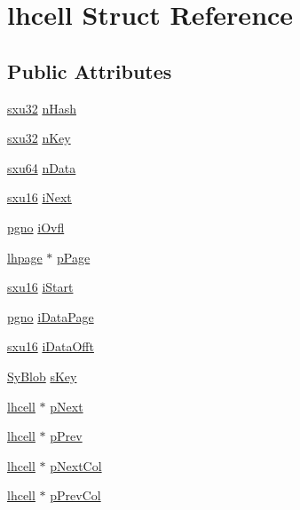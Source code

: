 \hypertarget{structlhcell}{\section{lhcell Struct Reference}
\label{d1/da5/structlhcell}
}
\subsection*{Public Attributes}
\begin{DoxyCompactItemize}
\item 
\hyperlink{unqlite_8c_abc5a8a3f345c200c98c485551f49666e}{sxu32} \hyperlink{structlhcell_ad83ba2a9872c6f072ad98863cf0d2006}{n\-Hash}
\item 
\hyperlink{unqlite_8c_abc5a8a3f345c200c98c485551f49666e}{sxu32} \hyperlink{structlhcell_a8f5089adfa380c55d39fe414ecc65e18}{n\-Key}
\item 
\hyperlink{unqlite_8c_a7fcad780486f719d7abaa7a12516b6c6}{sxu64} \hyperlink{structlhcell_a3fbad51e81a0a4ea44aae01e1fa2671e}{n\-Data}
\item 
\hyperlink{unqlite_8c_a0fea45724d256332e7ae0104f83260a7}{sxu16} \hyperlink{structlhcell_adf5c5ea52f46d1f944fa1560c871ae8a}{i\-Next}
\item 
\hyperlink{unqlite_8c_a90bf132c9229151f7c29e84e592907cd}{pgno} \hyperlink{structlhcell_ad0edd976a79c4282a1fb1ac0e3f8eb97}{i\-Ovfl}
\item 
\hyperlink{structlhpage}{lhpage} $\ast$ \hyperlink{structlhcell_a1aa65fd6233710175be3b01b98208d71}{p\-Page}
\item 
\hyperlink{unqlite_8c_a0fea45724d256332e7ae0104f83260a7}{sxu16} \hyperlink{structlhcell_a348e1a6f1f2a1fa7dd598372b4d68646}{i\-Start}
\item 
\hyperlink{unqlite_8c_a90bf132c9229151f7c29e84e592907cd}{pgno} \hyperlink{structlhcell_af508ceea349890124e66d31d2e0381d9}{i\-Data\-Page}
\item 
\hyperlink{unqlite_8c_a0fea45724d256332e7ae0104f83260a7}{sxu16} \hyperlink{structlhcell_a60c576e207171236463fc822811a70ee}{i\-Data\-Offt}
\item 
\hyperlink{struct_sy_blob}{Sy\-Blob} \hyperlink{structlhcell_a3b40873c9242c1f2e24ce63b9a1fb5a7}{s\-Key}
\item 
\hyperlink{structlhcell}{lhcell} $\ast$ \hyperlink{structlhcell_a7860a6f96483fa46116cd4cb68bb085d}{p\-Next}
\item 
\hyperlink{structlhcell}{lhcell} $\ast$ \hyperlink{structlhcell_ac52f671526b4a67022ebdc109acc4cd9}{p\-Prev}
\item 
\hyperlink{structlhcell}{lhcell} $\ast$ \hyperlink{structlhcell_a6ca135033e9852088e99ffd38708017e}{p\-Next\-Col}
\item 
\hyperlink{structlhcell}{lhcell} $\ast$ \hyperlink{structlhcell_acb148f7309e5784935cedefa38daed98}{p\-Prev\-Col}
\end{DoxyCompactItemize}


